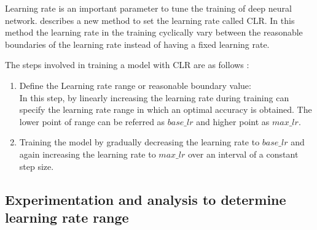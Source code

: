 Learning rate is an important parameter to tune the training of deep neural network. \parencite{Smith.03062015} describes a new method to set the learning rate called \acf{CLR}. In this method the learning rate in the training cyclically vary between the reasonable boundaries of the learning rate instead of having a fixed learning rate.

The steps involved in training a model with \acs{CLR} are as follows :

\begin{enumerate}
    \item Define the Learning rate range or reasonable boundary value: \\
    In this step, by linearly increasing the learning rate during training can specify the learning rate range in which an optimal accuracy is obtained. The lower point of range can be referred as $base\_lr$ and higher point as $max\_lr$.
    \item Training the model by gradually decreasing the learning rate to $base\_lr$ and again increasing the learning rate to $max\_lr$ over an interval of a constant step size.
\end{enumerate}


\subsection{Experimentation and analysis to determine learning rate range}

